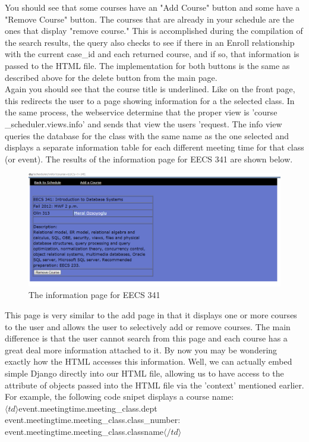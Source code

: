 \documentclass[pdftex,12pt,letter]{article}
\begin{document}
\FloatBarrier
You should see that some courses have an "Add Course" button and some have a "Remove Course" button. The courses that are already in your schedule are the ones that display "remove course." This is accomplished during the compilation of the search results, the query also checks to see if there in an Enroll relationship with the current case\_id and each returned course, and if so, that information is passed to the HTML file. The implementation for both buttons is the same as described above for the delete button from the main page.\\

Again you should see that the course title is underlined. Like on the front page, this redirects the user to a page showing information for a the selected class. In the same process, the webservice determine that the proper view is 'course \_scheduler.views.info' and sends that view the users 'request. The info view queries the database for the class with the same name as the one selected and displays a separate information table for each different meeting time for that class (or event). The results of the information page for EECS 341 are shown below.
\begin{figure}
\includegraphics[width=6in]{databaseInfo.png}
\caption{The information page for EECS 341}
\end{figure}
\FloatBarrier
This page is very similar to the add page in that it displays one or more courses to the user and allows the user to selectively add or remove courses. The main difference is that the user cannot search from this page and each course has a great deal more information attached to it. By now you may be wondering exactly how the HTML accesses this information. Well, we can actually embed simple Django directly into our HTML file, allowing us to have access to the attribute of objects passed into the HTML file via the 'context' mentioned earlier. For example, the following code snipet displays a course name:\\
$\langle td \rangle${{event.meetingtime.meeting\_class.dept}} {{event.meetingtime.meeting\_class.class\_number}}: {{event.meetingtime.meeting\_class.classname}}$\langle/td \rangle$\\
\end{document}
